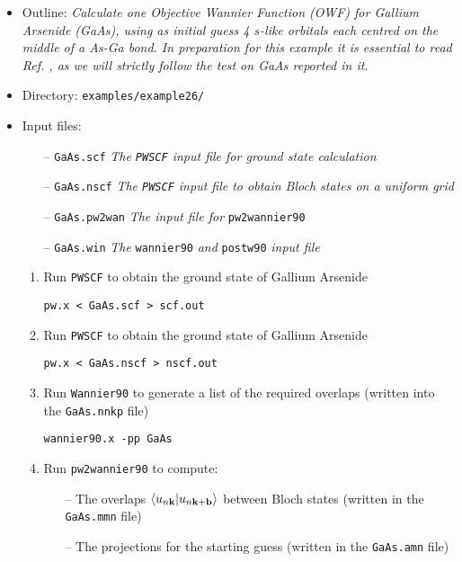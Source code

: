 \documentclass[a4paper,11pt,twoside]{article}
\begin{document}
\begin{itemize}

\item Outline: \textit{Calculate one Objective Wannier Function (OWF) for Gallium Arsenide (GaAs), using as initial guess 4 $s$-like orbitals each centred on the middle of a As-Ga bond. In preparation for this example it is essential to read Ref. \cite{Marianetti}, as we will strictly follow the test on GaAs reported in it. }


\item Directory: \verb|examples/example26/|


\item Input files:

\begin{itemize}

\item[--] \verb|GaAs.scf| \textit{The {\tt PWSCF} input file for ground state calculation}
\item[--] \verb|GaAs.nscf| \textit{The {\tt PWSCF} input file to obtain Bloch states on a uniform grid}
\item[--] \verb|GaAs.pw2wan| \textit{The input file for} \verb|pw2wannier90|
\item[--] \verb|GaAs.win| \textit{The} \verb|wannier90| \textit{and} \verb|postw90| \textit{input file}


\end{itemize}

\begin{enumerate}

\item Run {\tt PWSCF} to obtain the ground state of Gallium Arsenide

\verb|pw.x < GaAs.scf > scf.out|


\item Run {\tt PWSCF} to obtain the ground state of Gallium Arsenide

\verb|pw.x < GaAs.nscf > nscf.out|

\item Run {\tt Wannier90} to generate a list of the required overlaps (written into the \verb|GaAs.nnkp| file)

\verb|wannier90.x -pp GaAs|


\item Run {\tt pw2wannier90} to compute:

\begin{itemize}
\item[--] The overlaps $\langle u_{n\bf{k}}|u_{n\bf{k+b}}\rangle$ between  
Bloch states (written in the \verb|GaAs.mmn| file) 
\item[--] The projections for the starting guess (written in the \verb|GaAs.amn| file)


\end{itemize}
\end{enumerate}
\end{itemize}
\end{document}
